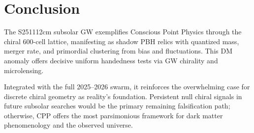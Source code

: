 \documentclass[11pt]{article}
\begin{document}
\section{Conclusion}
The S251112cm subsolar GW exemplifies Conscious Point Physics through the chiral 600-cell lattice, manifesting as shadow PBH relics with quantized mass, merger rate, and primordial clustering from bias and fluctuations. This DM anomaly offers decisive uniform handedness tests via GW chirality and microlensing.  

Integrated with the full 2025--2026 swarm, it reinforces the overwhelming case for discrete chiral geometry as reality's foundation. Persistent null chiral signals in future subsolar searches would be the primary remaining falsification path; otherwise, CPP offers the most parsimonious framework for dark matter phenomenology and the observed universe.
\end{document}

